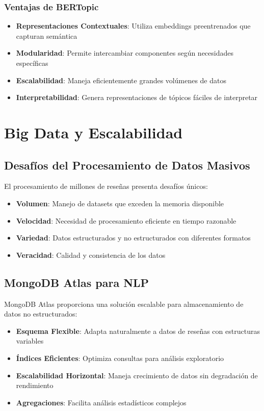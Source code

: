 \documentclass[12pt,a4paper,twoside,openany]{book}
\begin{document}
\subsubsection{Ventajas de BERTopic}

\begin{itemize}
    \item \textbf{Representaciones Contextuales}: Utiliza embeddings preentrenados que capturan semántica
    \item \textbf{Modularidad}: Permite intercambiar componentes según necesidades específicas
    \item \textbf{Escalabilidad}: Maneja eficientemente grandes volúmenes de datos
    \item \textbf{Interpretabilidad}: Genera representaciones de tópicos fáciles de interpretar
\end{itemize}

\section{Big Data y Escalabilidad}

\subsection{Desafíos del Procesamiento de Datos Masivos}

El procesamiento de millones de reseñas presenta desafíos únicos:

\begin{itemize}
    \item \textbf{Volumen}: Manejo de datasets que exceden la memoria disponible
    \item \textbf{Velocidad}: Necesidad de procesamiento eficiente en tiempo razonable
    \item \textbf{Variedad}: Datos estructurados y no estructurados con diferentes formatos
    \item \textbf{Veracidad}: Calidad y consistencia de los datos
\end{itemize}

\subsection{MongoDB Atlas para NLP}

MongoDB Atlas proporciona una solución escalable para almacenamiento de datos no estructurados:

\begin{itemize}
    \item \textbf{Esquema Flexible}: Adapta naturalmente a datos de reseñas con estructuras variables
    \item \textbf{Índices Eficientes}: Optimiza consultas para análisis exploratorio
    \item \textbf{Escalabilidad Horizontal}: Maneja crecimiento de datos sin degradación de rendimiento
    \item \textbf{Agregaciones}: Facilita análisis estadísticos complejos
\end{itemize}
\end{document}
